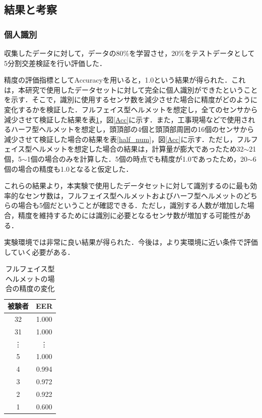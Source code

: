 \documentclass[Japanese,noauthor]{dicomopapers}
\begin{document}
\subsection{結果と考察}
\subsubsection{個人識別}
収集したデータに対して，データの80\%を学習させ，20\%をテストデータとして5分割交差検証を行い評価した．\par

精度の評価指標としてAccuracyを用いると，1.0という結果が得られた．これは，本研究で使用したデータセットに対して完全に個人識別ができたということを示す．そこで，識別に使用するセンサ数を減少させた場合に精度がどのように変化するかを検証した．フルフェイス型ヘルメットを想定し，全てのセンサから減少させて検証した結果を表\ref{full_num}，図\ref{Acc}に示す．また，工事現場などで使用されるハーフ型ヘルメットを想定し，頭頂部の4個と頭頂部周囲の16個のセンサから減少させて検証した場合の結果を表\ref{half_num}，図\ref{Acc}に示す．ただし，フルフェイス型ヘルメットを想定した場合の結果は，計算量が膨大であったため32$\sim$21個，5$\sim$1個の場合のみを計算した．5個の時点でも精度が1.0であったため，20$\sim$6個の場合の精度も1.0となると仮定した．\par


これらの結果より，本実験で使用したデータセットに対して識別するのに最も効率的なセンサ数は，フルフェイス型ヘルメットおよびハーフ型ヘルメットのどちらの場合も5個だということが確認できる．ただし，識別する人数が増加した場合，精度を維持するためには識別に必要となるセンサ数が増加する可能性がある．\par

実験環境では非常に良い結果が得られた．今後は，より実環境に近い条件で評価していく必要がある．

\begin{table}[!t]
  \centering
  \caption{フルフェイス型ヘルメットの場合の精度の変化}
  \begin{tabular}{c|c} \hline\hline
    被験者 & EER \\ \hline
    32 & 1.000 \\
    31 & 1.000 \\
    \vdots & \vdots \\
    5 & 1.000 \\
    4 & 0.994 \\
    3 & 0.972 \\
    2 & 0.922 \\
    1 & 0.600 \\ \hline
  \end{tabular}
  \label{full_num}
\end{table}
\end{document}
